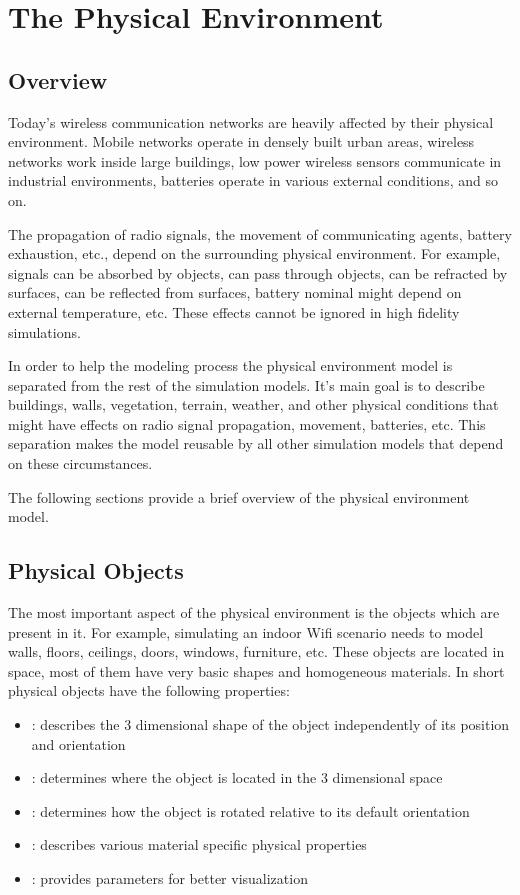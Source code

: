 \chapter{The Physical Environment}
\label{cha:environment}

\section{Overview}

Today's wireless communication networks are heavily affected by their physical
environment. Mobile networks operate in densely built urban areas, wireless
networks work inside large buildings, low power wireless sensors communicate
in industrial environments, batteries operate in various external conditions,
and so on.

The propagation of radio signals, the movement of communicating agents, battery
exhaustion, etc., depend on the surrounding physical environment. For example,
signals can be absorbed by objects, can pass through objects, can be refracted
by surfaces, can be reflected from surfaces, battery nominal might depend on
external temperature, etc. These effects cannot be ignored in high fidelity
simulations.

In order to help the modeling process the physical environment model is
separated from the rest of the simulation models. It's main goal is to describe
buildings, walls, vegetation, terrain, weather, and other physical conditions
that might have effects on radio signal propagation, movement, batteries, etc.
This separation makes the model reusable by all other simulation models that
depend on these circumstances.

The following sections provide a brief overview of the physical environment
model.

\section{Physical Objects}

The most important aspect of the physical environment is the objects which are
present in it. For example, simulating an indoor Wifi scenario needs to model
walls, floors, ceilings, doors, windows, furniture, etc. These objects are
located in space, most of them have very basic shapes and homogeneous materials.
In short physical objects have the following properties:

\begin{itemize}
  \item {}: describes the 3 dimensional shape of the object
independently of its position and orientation
  \item {}: determines where the object is located in the 3
dimensional space
  \item {}: determines how the object is rotated relative to its
default orientation
  \item {}: describes various material specific physical properties  
  \item {}: provides parameters for better visualization
\end{itemize}

